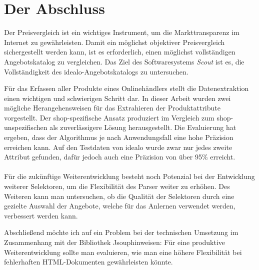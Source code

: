 \section{Der Abschluss}

Der Preisvergleich ist ein wichtiges Instrument, um die Markttransparenz im Internet zu gewährleisten.
Damit ein möglichst objektiver Preisvergleich sichergestellt werden kann, ist es erforderlich, einen möglichst
vollständigen Angebotskatalog zu vergleichen.
Das Ziel des Softwaresystems \textit{Scout} ist es, die Vollständigkeit des idealo-Angebotskatalogs zu untersuchen.

Für das Erfassen aller Produkte eines Onlinehändlers stellt die Datenextraktion einen wichtigen und schwierigen
Schritt dar.
In dieser Arbeit wurden zwei mögliche Herangehensweisen für das Extrahieren der Produktattribute vorgestellt.
Der shop-spezifische Ansatz produziert im Vergleich zum shop-unspezifischen als zuverlässigere Lösung herausgestellt.
Die Evaluierung hat ergeben, dass der Algorithmus je nach Anwendungsfall eine hohe Präzision erreichen kann.
Auf den Testdaten von idealo wurde zwar nur jedes zweite Attribut gefunden, dafür jedoch auch eine Präzision von über
95\% erreicht.
\\
~\\
Für die zukünftige Weiterentwicklung besteht noch Potenzial bei der Entwicklung weiterer Selektoren, um die
Flexibilität des Parser weiter zu erhöhen.
Des Weiteren kann man untersuchen, ob die Qualität der Selektoren durch eine gezielte Auswahl der Angebote, welche
für das Anlernen verwendet werden, verbessert werden kann.

Abschließend möchte ich auf ein Problem bei der technischen Umsetzung im Zusammenhang mit der Bibliothek
Jsoup\footnotemark hinweisen: Für eine produktive Weiterentwicklung sollte man evaluieren, wie man eine höhere
Flexibilität bei fehlerhaften HTML-Dokumenten gewährleisten könnte.
